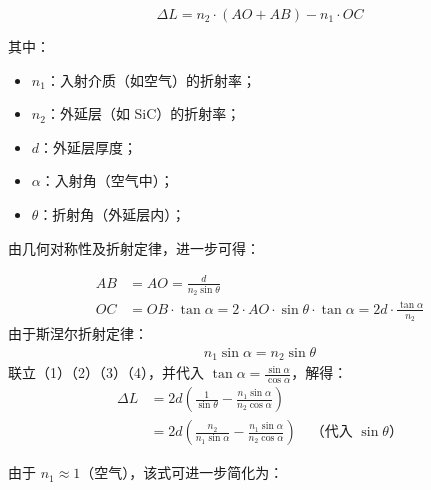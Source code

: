 \documentclass[withoutpreface,bwprint]{cumcmthesis}
\begin{document}
\begin{equation}
\Delta L = n_2 \cdot (AO + AB) - n_1 \cdot OC 
\end{equation}

其中：

\begin{itemize}
    \item $n_1$：入射介质（如空气）的折射率；
    \item $n_2$：外延层（如 SiC）的折射率；
    \item $d$：外延层厚度；
    \item $\alpha$：入射角（空气中）；
    \item $\theta$：折射角（外延层内）；
\end{itemize}
由几何对称性及折射定律，进一步可得：

\begin{align*}
AB &= AO = \frac{d}{n_2 \sin \theta}  \\
OC &= OB \cdot \tan \alpha = 2 \cdot AO \cdot \sin \theta \cdot \tan \alpha = 2d \cdot \frac{\tan \alpha}{n_2} 
\end{align*}
由于斯涅尔折射定律：
\begin{gather}
n_1 \sin \alpha = n_2 \sin \theta 
\end{gather}
联立（1）（2）（3）（4），并代入 $\tan \alpha = \frac{\sin \alpha}{\cos \alpha}$，解得：
\begin{align*}
\Delta L &= 2d \left( \frac{1}{\sin \theta} - \frac{n_1 \sin \alpha}{n_2 \cos \alpha} \right) \\
&= 2d \left( \frac{n_2}{n_1 \sin \alpha} - \frac{n_1 \sin \alpha}{n_2 \cos \alpha} \right) \quad \text{（代入 $\sin \theta$）}
\end{align*}

由于 $n_1 \approx 1$（空气），该式可进一步简化为：
\end{document}
